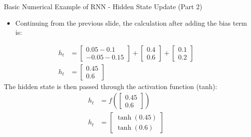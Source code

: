 \documentclass[serif, aspectratio=169]{beamer}
\begin{document}
\begin{frame}{Basic Numerical Example of RNN - Hidden State Update (Part 2)}
	\begin{itemize}
		\item Continuing from the previous slide, the calculation after adding the bias term is:
	\end{itemize}
	\begin{align*}
		h_t &= \begin{bmatrix} 0.05 - 0.1 \\ -0.05 - 0.15 \end{bmatrix} + \begin{bmatrix} 0.4 \\ 0.6 \end{bmatrix} + \begin{bmatrix} 0.1 \\ 0.2 \end{bmatrix} \\
		h_t &= \begin{bmatrix} 0.45 \\ 0.6 \end{bmatrix}
	\end{align*}
	\vspace{-10pt}
	The hidden state is then passed through the activation function (tanh):
	\begin{align*}
		h_t &= f\left(\begin{bmatrix} 0.45 \\ 0.6 \end{bmatrix}\right) \\
		h_t &= \begin{bmatrix} \tanh(0.45) \\ \tanh(0.6) \end{bmatrix}
	\end{align*}
\end{frame}
\end{document}
